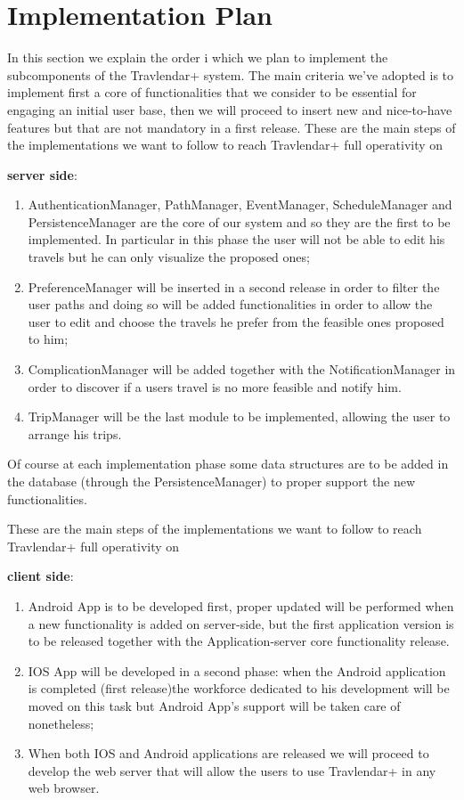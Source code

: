 \section{Implementation Plan}
In this section we explain the order i which we plan to implement the subcomponents of the Travlendar+ system.
The main criteria we've adopted is to implement first a core of functionalities that we consider to be essential for engaging an initial user base, then we will proceed to insert new and nice-to-have features but that are not mandatory in a first release.
These are the main steps of the implementations we want to follow to reach Travlendar+ full operativity on\begin{large}
\textbf{server side}:
\end{large}
\begin{enumerate}
\item AuthenticationManager, PathManager, EventManager, ScheduleManager and PersistenceManager are the core of our system and so they are the first to be implemented. In particular in this phase the user will not be able to edit his travels but he can only visualize the proposed ones;
\item PreferenceManager will be inserted in a second release in order to filter the user paths and doing so will be added functionalities in order to allow the user to edit and choose the travels he prefer from the feasible ones proposed to him;
\item ComplicationManager will be added together with the NotificationManager in order to discover if a users travel is no more feasible and notify him.
\item TripManager will be the last module to be implemented, allowing the user to arrange his trips.
\end{enumerate}
Of course at each implementation phase some data structures are to be added in the database (through the PersistenceManager) to proper support the new functionalities.

These are the main steps of the implementations we want to follow to reach Travlendar+ full operativity on\begin{large}
\textbf{client side}:
\end{large}
\begin{enumerate}
\item Android App is to be developed first, proper updated will be performed when a new functionality is added on server-side, but the first application version is to be released together with the Application-server core functionality release.
\item IOS App will be developed in a second phase: when the Android application is completed (first release)the workforce dedicated to his development will be moved on this task but Android App's support will be taken care of nonetheless;
\item When both IOS and Android applications are released we will proceed to develop the web server that will allow the users to use Travlendar+ in any web browser.
\end{enumerate}

